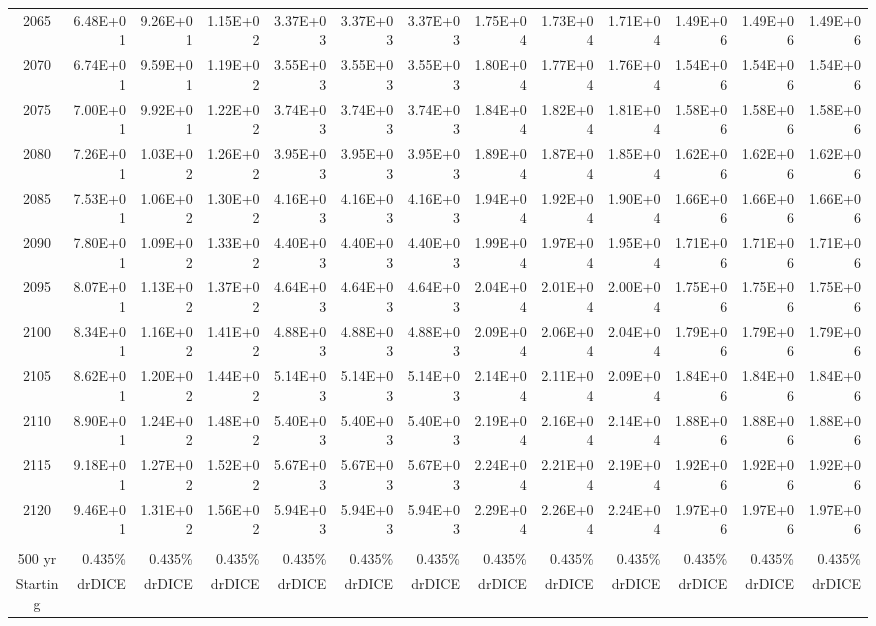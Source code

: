\documentclass{article}
\begin{document}
\begin{table}
\begin{tabular}{crrr|rrr|rrr|rrr}
2065     & 6.48E+01 & 9.26E+01 & 1.15E+02 & 3.37E+03 & 3.37E+03 & 3.37E+03 & 1.75E+04 & 1.73E+04 & 1.71E+04 & 1.49E+06 & 1.49E+06 & 1.49E+06 \\
2070     & 6.74E+01 & 9.59E+01 & 1.19E+02 & 3.55E+03 & 3.55E+03 & 3.55E+03 & 1.80E+04 & 1.77E+04 & 1.76E+04 & 1.54E+06 & 1.54E+06 & 1.54E+06 \\
2075     & 7.00E+01 & 9.92E+01 & 1.22E+02 & 3.74E+03 & 3.74E+03 & 3.74E+03 & 1.84E+04 & 1.82E+04 & 1.81E+04 & 1.58E+06 & 1.58E+06 & 1.58E+06 \\
2080     & 7.26E+01 & 1.03E+02 & 1.26E+02 & 3.95E+03 & 3.95E+03 & 3.95E+03 & 1.89E+04 & 1.87E+04 & 1.85E+04 & 1.62E+06 & 1.62E+06 & 1.62E+06 \\
2085     & 7.53E+01 & 1.06E+02 & 1.30E+02 & 4.16E+03 & 4.16E+03 & 4.16E+03 & 1.94E+04 & 1.92E+04 & 1.90E+04 & 1.66E+06 & 1.66E+06 & 1.66E+06 \\
2090     & 7.80E+01 & 1.09E+02 & 1.33E+02 & 4.40E+03 & 4.40E+03 & 4.40E+03 & 1.99E+04 & 1.97E+04 & 1.95E+04 & 1.71E+06 & 1.71E+06 & 1.71E+06 \\
2095     & 8.07E+01 & 1.13E+02 & 1.37E+02 & 4.64E+03 & 4.64E+03 & 4.64E+03 & 2.04E+04 & 2.01E+04 & 2.00E+04 & 1.75E+06 & 1.75E+06 & 1.75E+06 \\
2100     & 8.34E+01 & 1.16E+02 & 1.41E+02 & 4.88E+03 & 4.88E+03 & 4.88E+03 & 2.09E+04 & 2.06E+04 & 2.04E+04 & 1.79E+06 & 1.79E+06 & 1.79E+06 \\
2105     & 8.62E+01 & 1.20E+02 & 1.44E+02 & 5.14E+03 & 5.14E+03 & 5.14E+03 & 2.14E+04 & 2.11E+04 & 2.09E+04 & 1.84E+06 & 1.84E+06 & 1.84E+06 \\
2110     & 8.90E+01 & 1.24E+02 & 1.48E+02 & 5.40E+03 & 5.40E+03 & 5.40E+03 & 2.19E+04 & 2.16E+04 & 2.14E+04 & 1.88E+06 & 1.88E+06 & 1.88E+06 \\
2115     & 9.18E+01 & 1.27E+02 & 1.52E+02 & 5.67E+03 & 5.67E+03 & 5.67E+03 & 2.24E+04 & 2.21E+04 & 2.19E+04 & 1.92E+06 & 1.92E+06 & 1.92E+06 \\
2120     & 9.46E+01 & 1.31E+02 & 1.56E+02 & 5.94E+03 & 5.94E+03 & 5.94E+03 & 2.29E+04 & 2.26E+04 & 2.24E+04 & 1.97E+06 & 1.97E+06 & 1.97E+06 \\
         &          &          &          &          &          &          &          &          &          &          &          &          \\ \hline
500 yr   & 0.435\%  & 0.435\%  & 0.435\%  & 0.435\%  & 0.435\%  & 0.435\%  & 0.435\%  & 0.435\%  & 0.435\%  & 0.435\%  & 0.435\%  & 0.435\%  \\
Starting & drDICE   & drDICE   & drDICE   & drDICE   & drDICE   & drDICE   & drDICE   & drDICE   & drDICE   & drDICE   & drDICE   & drDICE   \\

\end{tabular}
\end{table}
\end{document}
